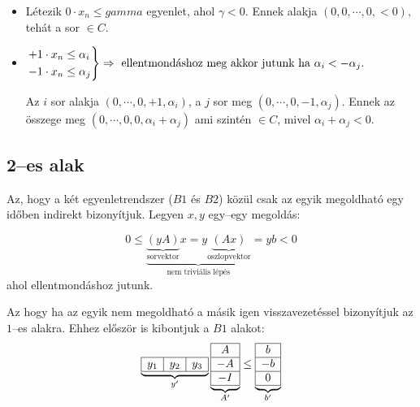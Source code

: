 \begin{itemize}
  \item Létezik $0 \cdot x_n \leq gamma$ egyenlet, ahol $\gamma < 0$. Ennek alakja 
  $(0,0, \cdots, 0, <0),$ tehát a sor $\in C$.
  \item $\begin{rcases}
  +1 \cdot x_n \leq \alpha_i \\ 
  -1 \cdot x_n \leq \alpha_j \\
  \end{rcases} \Rightarrow  \mbox{ ellentmondáshoz meg akkor jutunk ha }
  \alpha_i < -\alpha_j.$
  
  Az $i$ sor alakja $(0, \cdots, 0, +1, \alpha_i)$, a $j$ sor meg $(0, \cdots,
  0, -1, \alpha_j)$. Ennek az összege meg $(0, \cdots, 0, 0, \alpha_i+\alpha_j)$
  ami szintén $\in C$, mivel $\alpha_i+\alpha_j<0$.
\end{itemize}

\subsection{2--es alak}

Az, hogy a két egyenletrendszer ($B1$ és $B2$) közül csak az egyik megoldható
egy időben indirekt bizonyítjuk. Legyen $x,y$ egy--egy megoldás:

\[ 0 \leq \underbrace{
		   \underbrace{(yA)}_{\mbox{sorvektor}}x = 
		  y\underbrace{(Ax)}_{\mbox{oszlopvektor}}}
		  _{\mbox{nem triviális lépés}}=yb<0\] ahol ellentmondáshoz jutunk.



Az hogy ha az egyik nem megoldható a másik igen visszavezetéssel bizonyítjuk az
$1$--es alakra. Ehhez először is kibontjuk a $B1$ alakot:
\begin{displaymath}
\underbrace{
\begin{array}{|c|c|c|}
\hline
y_1 & y_2  & y_3\\
\hline
\end{array}}_{y'}
\underbrace{
\begin{array}{|c|}
\hline
A \\
\hline
-A\\
\hline
-I \\
\hline
\end{array}}_{A'}
\leq
\underbrace{
\begin{array}{|c|}
\hline
b \\
\hline
-b\\
\hline
0 \\
\hline
\end{array}}_{b'}
\end{displaymath}

